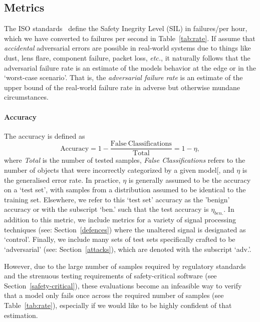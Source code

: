 \subsection{Metrics}


\label{metrics}
The ISO standards~\cite{iso26262} define the Safety Inegrity Level (SIL) in failures/per hour, which we have converted to failures per second in Table~\ref{tab:rate}.
If assume that \textit{accidental} adversarial errors are possible in real-world systems due to things like dust, lens flare, component failure, packet loss, \textit{etc.}, it naturally follows that the adversarial failure rate is an estimate of the models behavior at the edge or in the `worst-case scenario'.
That is, the \textit{adversarial failure rate} is an estimate of the upper bound of the real-world failure rate in adverse but otherwise mundane circumstances.




\paragraph{Accuracy}

The accuracy is defined as
\begin{equation}\label{eq:accuracy}
    \mathrm{Accuracy}
    = 1 - \frac{\mathrm{False~Classifications}}{\mathrm{Total}}
    = 1 - \eta,
\end{equation}
where \textit{Total} is the number of tested samples, \textit{False Classifications} refers to the number of objects that were incorrectly categorized by a given model[, and $\eta$ is the generalised error rate.
In practice, $\eta$ is generally assumed to be the accuracy on a `test set', with samples from a distribution assumed to be identical to the training set.
Elsewhere, we refer to this `test set' accuracy as the 'benign' accuracy or with the subscript `ben.' such that the test accuracy is $\eta_{ben.}$.
In addition to this metric, we include metrics for a variety of signal processing techniques (see: Section~\ref{defences}) where the unaltered signal is designated as `control'.
Finally, we include many sets of test sets specifically crafted to be `adversarial' (see: Section~\ref{attacks}), which are denoted with the subscript `adv.'.

However, due to the large number of samples required by regulatory standards  and the strenuous testing requirements of safety-critical software (see Section~\ref{safety-critical}), these evaluations become an infeasible way to verify that a model only fails once across the required number of samples (see Table~\ref{tab:rate}), especially if we would like to be highly confident of that estimation.

